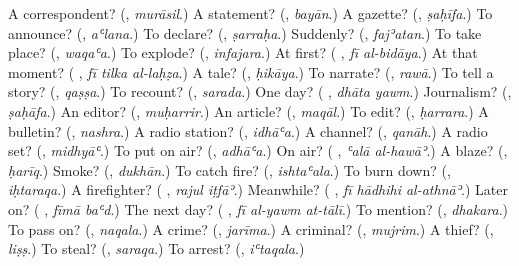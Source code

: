 \begin{tcolorbox}[breakable,colback=teal!4,colframe=teal!35!black,title={Before you move on}]
A correspondent? (\textbf{}, \emph{murāsil}.) A statement? (\textbf{}, \emph{bayān}.) A gazette? (\textbf{}, \emph{ṣaḥīfa}.) To announce? (\textbf{}, \emph{aʿlana}.) To declare? (\textbf{}, \emph{ṣarraḥa}.) Suddenly? (\textbf{}, \emph{fajʾatan}.) To take place? (\textbf{}, \emph{waqaʿa}.) To explode? (\textbf{}, \emph{infajara}.) At first? (\textbf{ }, \emph{fī al-bidāya}.) At that moment? (\textbf{  }, \emph{fī tilka al-laḥẓa}.) A tale? (\textbf{}, \emph{ḥikāya}.) To narrate? (\textbf{}, \emph{rawā}.) To tell a story? (\textbf{}, \emph{qaṣṣa}.) To recount? (\textbf{}, \emph{sarada}.) One day? (\textbf{ }, \emph{dhāta yawm}.) Journalism? (\textbf{}, \emph{ṣaḥāfa}.) An editor? (\textbf{}, \emph{muḥarrir}.) An article? (\textbf{}, \emph{maqāl}.) To edit? (\textbf{}, \emph{ḥarrara}.) A bulletin? (\textbf{}, \emph{nashra}.) A radio station? (\textbf{}, \emph{idhāʿa}.) A channel? (\textbf{}, \emph{qanāh}.) A radio set? (\textbf{}, \emph{midhyāʿ}.) To put on air? (\textbf{}, \emph{adhāʿa}.) On air? (\textbf{ }, \emph{ʿalā al-hawāʾ}.) A blaze? (\textbf{}, \emph{ḥarīq}.) Smoke? (\textbf{}, \emph{dukhān}.) To catch fire? (\textbf{}, \emph{ishtaʿala}.) To burn down? (\textbf{}, \emph{iḥtaraqa}.) A firefighter? (\textbf{ }, \emph{rajul iṭfāʾ}.) Meanwhile? (\textbf{  }, \emph{fī hādhihi al-athnāʾ}.) Later on? (\textbf{ }, \emph{fīmā baʿd}.) The next day? (\textbf{  }, \emph{fī al-yawm at-tālī}.) To mention? (\textbf{}, \emph{dhakara}.) To pass on? (\textbf{}, \emph{naqala}.) A crime? (\textbf{}, \emph{jarīma}.) A criminal? (\textbf{}, \emph{mujrim}.) A thief? (\textbf{}, \emph{liṣṣ}.) To steal? (\textbf{}, \emph{saraqa}.) To arrest? (\textbf{}, \emph{iʿtaqala}.)
\end{tcolorbox}
